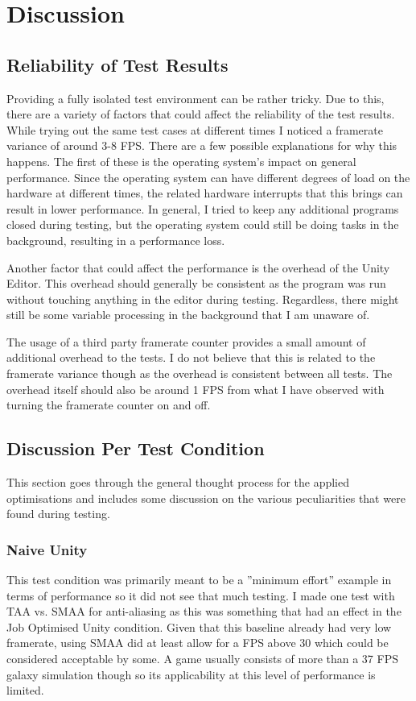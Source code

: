 \chapter{Discussion}
\section{Reliability of Test Results}
Providing a fully isolated test environment can be rather tricky. Due to this, there are a variety of factors that could affect the reliability of the test results. While trying out the same test cases at different times I noticed a framerate variance of around 3-8 FPS. There are a few possible explanations for why this happens. The first of these is the operating system's impact on general performance. Since the operating system can have different degrees of load on the hardware at different times, the related hardware interrupts that this brings can result in lower performance. In general, I tried to keep any additional programs closed during testing, but the operating system could still be doing tasks in the background, resulting in a performance loss. 

Another factor that could affect the performance is the overhead of the Unity Editor. This overhead should generally be consistent as the program was run without touching anything in the editor during testing. Regardless, there might still be some variable processing in the background that I am unaware of. 

The usage of a third party framerate counter provides a small amount of additional overhead to the tests. I do not believe that this is related to the framerate variance though as the overhead is consistent between all tests. The overhead itself should also be around 1 FPS from what I have observed with turning the framerate counter on and off. 
\section{Discussion Per Test Condition}
This section goes through the general thought process for the applied optimisations and includes some discussion on the various peculiarities that were found during testing. 

\subsection{Naive Unity}
This test condition was primarily meant to be a ''minimum effort'' example in terms of performance so it did not see that much testing. I made one test with TAA vs. SMAA for anti-aliasing as this was something that had an effect in the Job Optimised Unity condition. Given that this baseline already had very low framerate, using SMAA did at least allow for a FPS above 30 which could be considered acceptable by some. A game usually consists of more than a 37 FPS galaxy simulation though so its applicability at this level of performance is limited. 


